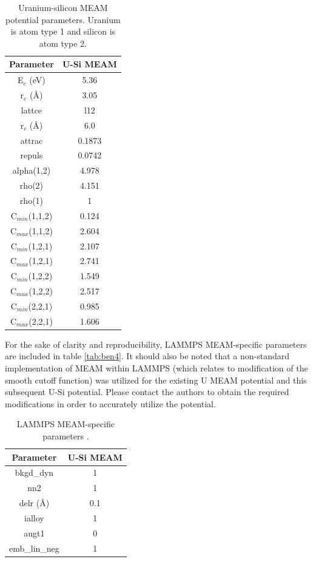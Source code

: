 \documentclass[review]{elsarticle}
\begin{document}
\begin{table}[h]
\caption{Uranium-silicon MEAM potential parameters.  Uranium is atom type 1 and silicon is atom type 2.}\label{tab:ben3}
\begin{center}
\begin{tabular}{|c|c|}
     \hline
     Parameter & U-Si MEAM  \\
     \hline
     E$_{c}$ (eV) & 5.36 \\ 
     r$_{e}$ (\AA) & 3.05 \\
     lattce & l12 \\
     r$_{c}$ (\AA) & 6.0 \\
     attrac & 0.1873  \\
     repuls & 0.0742  \\
     alpha(1,2) & 4.978 \\
     rho(2) & 4.151 \\
     rho(1) & 1 \\
     C$_{min}$(1,1,2) & 0.124 \\
     C$_{max}$(1,1,2) & 2.604 \\
     C$_{min}$(1,2,1) & 2.107 \\
     C$_{max}$(1,2,1) & 2.741 \\
     C$_{min}$(1,2,2) & 1.549 \\
     C$_{max}$(1,2,2) & 2.517 \\
     C$_{min}$(2,2,1) & 0.985 \\  
     C$_{max}$(2,2,1) & 1.606 \\
     \hline
\end{tabular}
\end{center}
\label{default}
\end{table}%

For the sake of clarity and reproducibility, LAMMPS MEAM-specific parameters are included in table \ref{tab:ben4}.  It should also be noted that a non-standard implementation of MEAM within LAMMPS (which relates to modification of the smooth cutoff function) was utilized for the existing U MEAM potential and this subsequent U-Si potential.  Please contact the authors to obtain the required modifications in order to accurately utilize the potential.  

\begin{table}[h!]
\caption{LAMMPS MEAM-specific parameters \cite{plimpton1995}.}\label{tab:ben4}
\begin{center}
\begin{tabular}{|c|c|}
     \hline
     Parameter & U-Si MEAM  \\
     \hline
     bkgd\_dyn & 1 \\
     nn2 & 1 \\
     delr (\AA)& 0.1 \\
     ialloy & 1 \\
     augt1 & 0 \\
     emb\_lin\_neg & 1 \\
     \hline
\end{tabular}
\end{center}
\label{default}
\end{table}%
\end{document}
